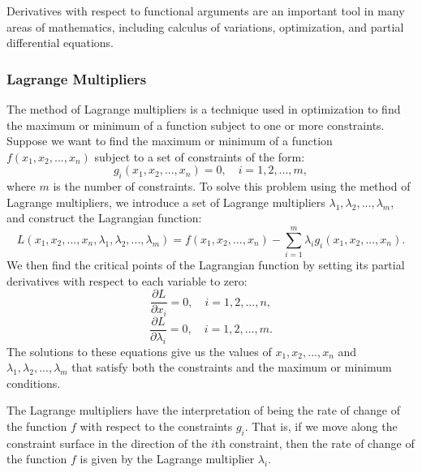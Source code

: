 \begin{subappendices}
Derivatives with respect to functional arguments are an important tool in many areas of mathematics, including calculus of variations, optimization, and partial differential equations.

\subsubsection*{Lagrange Multipliers}
The method of Lagrange multipliers is a technique used in optimization to find the maximum or minimum of a function subject to one or more constraints.
Suppose we want to find the maximum or minimum of a function $f(x_1, x_2, ..., x_n)$ subject to a set of constraints of the form:
\begin{equation}
    g_i(x_1, x_2, ..., x_n) = 0, \quad i = 1, 2, ..., m,
\end{equation}
where $m$ is the number of constraints. To solve this problem using the method of Lagrange multipliers, we introduce a set of Lagrange multipliers $\lambda_1, \lambda_2, ..., \lambda_m$, and construct the Lagrangian function:
\begin{equation}
    L(x_1, x_2, ..., x_n, \lambda_1, \lambda_2, ..., \lambda_m) = f(x_1, x_2, ..., x_n) - \sum_{i=1}^m \lambda_i g_i(x_1, x_2, ..., x_n).
\end{equation}
We then find the critical points of the Lagrangian function by setting its partial derivatives with respect to each variable to zero:
\begin{equation}
    \frac{\partial L}{\partial x_i} = 0, \quad i = 1, 2, ..., n,
\end{equation}
\begin{equation}
    \frac{\partial L}{\partial \lambda_i} = 0, \quad i = 1, 2, ..., m.
\end{equation}
The solutions to these equations give us the values of $x_1, x_2, ..., x_n$ and $\lambda_1, \lambda_2, ..., \lambda_m$ that satisfy both the constraints and the maximum or minimum conditions.

The Lagrange multipliers have the interpretation of being the rate of change of the function $f$ with respect to the constraints $g_i$. That is, if we move along the constraint surface in the direction of the $i$th constraint, then the rate of change of the function $f$ is given by the Lagrange multiplier $\lambda_i$.

\end{subappendices}
